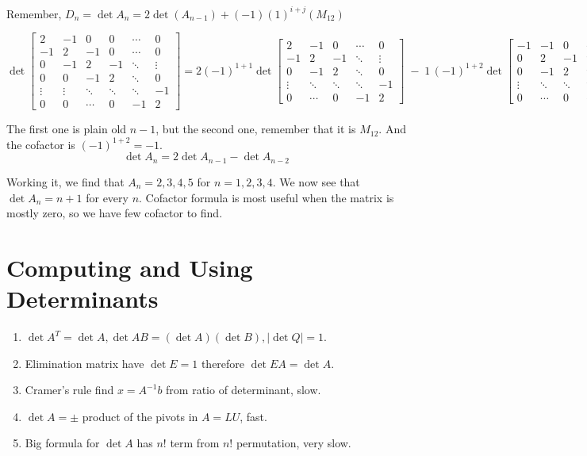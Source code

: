 Remember, \(D_n = \det A_n = 2 \det(A_{n-1}) + (-1) (1)^{i+j} (M_{12} )\)

\[
\det\!\begin{bmatrix}
2 & -1 & 0 & 0 & \cdots & 0\\
-1 & 2 & -1 & 0 & \cdots & 0\\
0 & -1 & 2 & -1 & \ddots & \vdots\\
0 & 0 & -1 & 2 & \ddots & 0\\
\vdots & \vdots & \ddots & \ddots & \ddots & -1\\
0 & 0 & \cdots & 0 & -1 & 2
\end{bmatrix}
=
2(-1)^{1+1}\!
\det\!\begin{bmatrix}
2 & -1 & 0 & \cdots & 0\\
-1 & 2 & -1 & \ddots & \vdots\\
0 & -1 & 2 & \ddots & 0\\
\vdots & \ddots & \ddots & \ddots & -1\\
0 & \cdots & 0 & -1 & 2
\end{bmatrix}
\;-\;
1\,(-1)^{1+2}\!
\det\!\begin{bmatrix}
-1 & -1 & 0 & \cdots & 0\\
0 & 2 & -1 & \ddots & \vdots\\
0 & -1 & 2 & \ddots & 0\\
\vdots & \ddots & \ddots & \ddots & -1\\
0 & \cdots & 0 & -1 & 2
\end{bmatrix}.
\]


The first one is plain old \(n - 1\), but the second one, remember that it is \(M_{12} \). And the cofactor is \((-1)^{1+2} = -1\). 
\[
  \det  A_n = 2 \det A_{n-1} - \det A_{n-2}  
\]   

Working it, we find that \(A_n = 2, 3, 4, 5\) for \(n = 1, 2, 3, 4\). We now see that \(\det A_n = n + 1\) for every \(n\). Cofactor formula is most useful when the matrix is mostly zero, so we have few cofactor to find.         

\section{Computing and Using Determinants}

\begin{enumerate}
  \item \(\det A^T = \det A, \det AB = (\det A)(\det B), \vert \det Q \vert = 1 \).
  \item Elimination matrix have \(\det E = 1\) therefore \(\det EA = \det A\).  
  \item Cramer's rule find \(x = A^{-1} b \) from ratio of determinant, slow. 
  \item \(\det A = \pm \) product of the pivots in \(A = LU\), fast. 
  \item Big formula for \(\det A\) has \(n!\) term from \(n!\) permutation, very slow.      
\end{enumerate}

